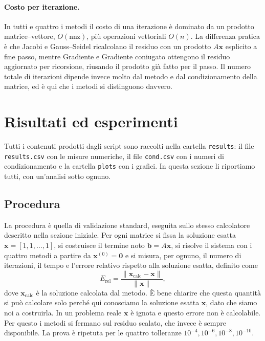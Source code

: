 \documentclass[11pt,a4paper]{article}
\begin{document}
\paragraph{Costo per iterazione.} In tutti e quattro i metodi il costo di una
iterazione è dominato da un prodotto matrice--vettore, $O(\text{nnz})$, più
operazioni vettoriali $O(n)$. La differenza pratica è che Jacobi e Gauss--Seidel
ricalcolano il residuo con un prodotto $A\mathbf{x}$ esplicito a fine passo,
mentre Gradiente e Gradiente coniugato ottengono il residuo aggiornato per
ricorsione, riusando il prodotto già fatto per il passo. Il numero totale di
iterazioni dipende invece molto dal metodo e dal condizionamento della matrice,
ed è qui che i metodi si distinguono davvero.

\section{Risultati ed esperimenti}\label{sec:risultati}
Tutti i contenuti prodotti dagli script sono raccolti nella cartella
\texttt{results}: il file \texttt{results.csv} con le misure numeriche, il file
\texttt{cond.csv} con i numeri di condizionamento e la cartella \texttt{plots}
con i grafici. In questa sezione li riportiamo tutti, con un'analisi sotto ognuno.

\subsection{Procedura}
La procedura è quella di validazione standard, eseguita sullo stesso calcolatore
descritto nella sezione iniziale. Per ogni matrice si fissa la
soluzione esatta $\mathbf{x}=[1,1,\dots,1]$, si costruisce il termine noto
$\mathbf{b}=A\mathbf{x}$, si risolve il sistema con i quattro metodi a partire da
$\mathbf{x}^{(0)}=\mathbf{0}$ e si misura, per ognuno, il numero di iterazioni,
il tempo e l'errore relativo rispetto alla soluzione esatta, definito come
\[
E_{\mathrm{rel}}=\frac{\|\mathbf{x}_{\text{calc}}-\mathbf{x}\|}{\|\mathbf{x}\|},
\]
dove $\mathbf{x}_{\text{calc}}$ è la soluzione calcolata dal metodo. È bene
chiarire che questa quantità si può calcolare solo perché qui conosciamo la
soluzione esatta $\mathbf{x}$, dato che siamo noi a costruirla. In un problema
reale $\mathbf{x}$ è ignota e questo errore non è calcolabile. Per questo i metodi si fermano sul residuo
scalato, che invece è sempre disponibile. La
prova è ripetuta per le quattro tolleranze $10^{-4},10^{-6},10^{-8},10^{-10}$.
\end{document}
